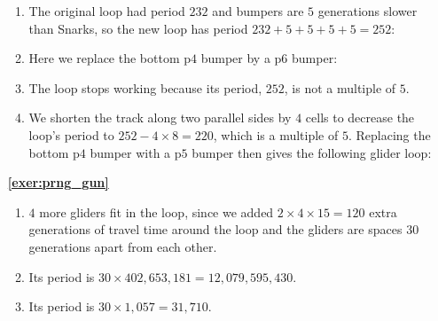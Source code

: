 \begin{multicols}{2}
\begin{itemize}[leftmargin=0em]
\begin{enumerate}[leftmargin=1.5em,label=\bf\color{ocre}(\alph*)]
			\item The original loop had period $232$ and bumpers are $5$ generations slower than Snarks, so the new loop has period $232+5+5+5+5 = 252$:
			
			\noindent\begin{center}
			\end{center}
		
			\item Here we replace the bottom p$4$ bumper by a p$6$ bumper:
			
			\noindent\begin{center}
			\end{center}
		
			\item The loop stops working because its period, $252$, is not a multiple of $5$.
			
			\item We shorten the track along two parallel sides by $4$ cells to decrease the loop's period to $252 - 4 \times 8 = 220$, which is a multiple of $5$. Replacing the bottom p$4$ bumper with a p$5$ bumper then gives the following glider loop:
			
			\noindent\begin{center}
			\end{center}
		\end{enumerate}
	

		\item[\bf\color{ocre}\sffamily\ref{exer:prng_gun}] \begin{enumerate}[leftmargin=1.5em,label=\bf\color{ocre}(\alph*)]
			\item $4$ more gliders fit in the loop, since we added $2 \times 4 \times 15 = 120$ extra generations of travel time around the loop and the gliders are spaces $30$ generations apart from each other.
		
			\item Its period is $30 \times 402,653,181 = 12,079,595,430$.
		
			\item Its period is $30 \times 1,057 = 31,710$.
		\end{enumerate}
	\end{itemize}
\end{multicols}



\hypertarget{solutions_stable_circuitry}{}\label{solutions_stable_circuitry}
